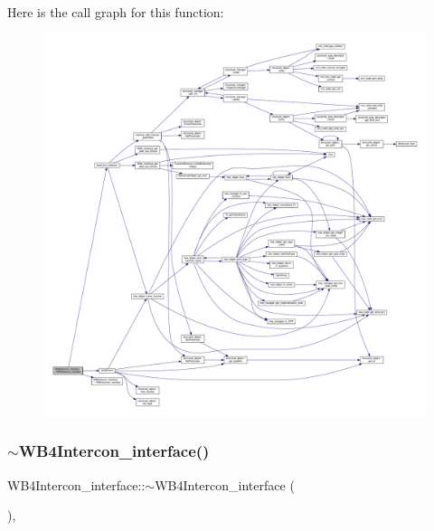 Here is the call graph for this function\+:
\nopagebreak
\begin{figure}[H]
\begin{center}
\leavevmode
\includegraphics[width=350pt]{de/d3d/classWB4Intercon__interface_a96bae582bff7598c0d99d4851b8ec97c_cgraph}
\end{center}
\end{figure}
\mbox{\label{classWB4Intercon__interface_a474d261542b25f923f4cbfac6a74e074}} 
\subsubsection{\texorpdfstring{$\sim$\+W\+B4\+Intercon\+\_\+interface()}{~WB4Intercon\_interface()}}
{\footnotesize\ttfamily W\+B4\+Intercon\+\_\+interface\+::$\sim$\+W\+B4\+Intercon\+\_\+interface (\begin{DoxyParamCaption}{ }\end{DoxyParamCaption})\hspace{0.3cm}{\ttfamily [override]}, {\ttfamily [default]}}



